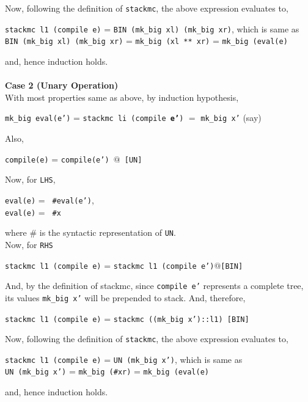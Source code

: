 \documentclass{article}
\begin{document}
    Now, following the definition of \texttt{stackmc}, the above expression evaluates to,
    \begin{center}
        {\texttt{stackmc l1 (compile e)} = \texttt{BIN (mk\_big xl) (mk\_big xr)}}, {\tiny which is same as} \\[5pt]
        {\small \texttt{BIN (mk\_big xl) (mk\_big xr)} = \texttt{mk\_big (xl ** xr)} = \texttt{mk\_big (eval(e)}}
    \end{center}
    and, hence induction holds. \\
\pagebreak
\\
\textbf{Case 2 (Unary Operation)} \\ [5 pt]
With most properties same as above, by induction hypothesis,
\begin{center}
    \texttt{mk\_big eval(e')} =  \texttt{stackmc li (compile \textbf{e'})} \(=\) \texttt{mk\_big x'} (say) 
\end{center}
Also,
    \begin{center}
        \texttt{compile(e)} = \texttt{compile(e') $@$ [UN]}
    \end{center}
    Now, for \texttt{LHS}, 
    \begin{center}
        \texttt{eval(e)} = \texttt{ \#eval(e')},\\
        \texttt{eval(e)} = \texttt{ \#x}                               
    \end{center}
    where \# is the syntactic representation of \texttt{UN}. \\[5pt]
    Now, for \texttt{RHS} 
    \begin{center}
        {\small \texttt{stackmc l1 (compile e)} = \texttt{stackmc l1 (compile e')$@$[BIN]}}
    \end{center}
    And, by the definition of stackmc, since \texttt{compile e'} represents a complete tree, its values \texttt{mk\_big x'} will be prepended to stack. And, therefore,
    \begin{center}
        {\small \texttt{stackmc l1 (compile e)} = \texttt{stackmc ((mk\_big x')::l1) [BIN]}}
    \end{center}
    Now, following the definition of \texttt{stackmc}, the above expression evaluates to,
    \begin{center}
        {\texttt{stackmc l1 (compile e)} = \texttt{UN (mk\_big x')}}, {\tiny which is same as} \\[5pt]
        {\small \texttt{UN (mk\_big x')} = \texttt{mk\_big (\#xr)} = \texttt{mk\_big (eval(e)}}
    \end{center}
    and, hence induction holds. \\
\end{document}
